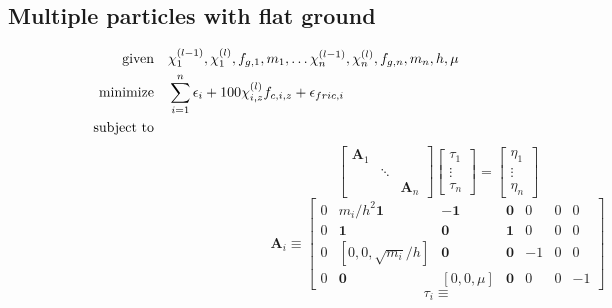 \documentclass[a4paper,10pt]{article}
\begin{document}
\begin{landscape}
\subsection{Multiple particles with flat ground}
\begin{align}
\text{given}      & \quad \chi^{(l-1)}_1, \chi^{(l)}_1, f_{g,1}, m_1,\dots
                          \chi^{(l-1)}_n, \chi^{(l)}_n, f_{g,n}, m_n,
                          h, \mu \notag\\
\text{minimize}   & \quad \sum_{i=1}^n \epsilon_i + 100\chi^{(l)}_{i,z} f_{c,i,z} + \epsilon_{fric,i} \notag\\
\text{subject to} & \quad\quad\quad\quad\quad\quad\quad\quad\quad\quad\quad\quad\quad\quad\quad
\quad\quad\quad\quad\quad\quad\quad\quad\quad\quad\quad\quad\quad\quad\quad
\quad\quad\quad\quad\quad\quad\quad\quad\quad\quad\quad\quad\quad\quad\quad \notag
\end{align}
\begin{equation}
\left[\begin{array}{ccc}
\mathbf{A}_1 &         &  \\
             & \ddots  &  \\
             &         & \mathbf{A}_n
\end{array}\right]
\left[\begin{array}{c}
\tau_1  \\
 \vdots \\
\tau_n
\end{array}\right]
=
\left[\begin{array}{c}
\eta_1  \\
 \vdots \\
\eta_n
\end{array}\right]
\end{equation}
\begin{equation}
\mathbf{A}_i \equiv
\left[\begin{array}{ccccccc}
0 & m_i/h^2\mathbf{1}     & -\mathbf{1}   & \mathbf{0} & 0 & 0 & 0 \\
0 &    \mathbf{1}         & \mathbf{0}    & \mathbf{1} & 0 & 0 & 0 \\
0 & [ 0, 0, \sqrt{m_i}/h] & \mathbf{0}    & \mathbf{0} & -1 & 0 & 0 \\
0 & \mathbf{0}            & [ 0, 0, \mu ] & \mathbf{0} & 0 & 0 & -1
\end{array}\right]
\end{equation}
\begin{equation}
\tau_i \equiv

\end{equation}
\end{landscape}
\end{document}
